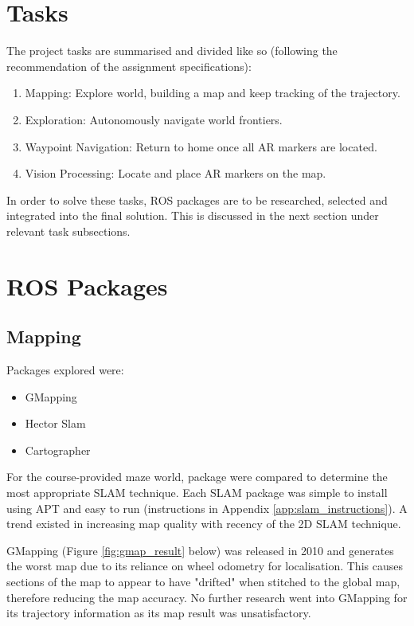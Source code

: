 \documentclass[11pt, a4, nocenter, margin=150mm]{article}
\begin{document}

\section{Tasks}
\label{sec:tasks}
	The project tasks are summarised and divided like so (following the recommendation of the assignment specifications):

	\begin{enumerate}
		\item Mapping: Explore world, building a map and keep tracking of the trajectory.
		\item Exploration: Autonomously navigate world frontiers.
		\item Waypoint Navigation: Return to home once all AR markers are located.
		\item Vision Processing: Locate and place AR markers on the map.
	\end{enumerate}

	In order to solve these tasks, ROS packages are to be researched, selected and integrated into the final solution. This is discussed in the next section under relevant task subsections.

\section{ROS Packages}
\label{sec:packages}

	\subsection{Mapping}
	\label{sec:mapping}

		Packages explored were:
		\begin{itemize}[noitemsep, nolistsep]
			\item GMapping
			\item Hector Slam
			\item Cartographer
		\end{itemize}

		For the course-provided maze world, package were compared to determine the most appropriate SLAM technique. Each SLAM package was simple to install using APT and easy to run (instructions in Appendix \ref{app:slam_instructions}). A trend existed in increasing map quality with recency of the 2D SLAM technique.
		
		GMapping (Figure \ref{fig:gmap_result} below) was released in 2010 and generates the worst map due to its reliance on wheel odometry for localisation. This causes sections of the map to appear to have "drifted" when stitched to the global map, therefore reducing the map accuracy. No further research went into GMapping for its trajectory information as its map result was unsatisfactory.
\end{document}
